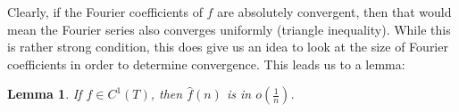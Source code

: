 \documentclass[12pt, titlepage]{article}
\newtheorem{lem}[thm]{Lemma}
\theoremstyle{definition}
\newcommand{\vep}{\varepsilon}
\newcommand{\norm}[1]{\left\lVert#1\right\rVert}
\begin{document}
Clearly, if the Fourier coefficients of $f$ are absolutely convergent, then that would mean the Fourier series also converges uniformly (triangle inequality). While this is rather strong condition, this does give us an idea to look at the size of Fourier coefficients in order to determine convergence. This leads us to a lemma:
%
%    
%
%
\begin{lem}
    If $f \in C^1(T)$, then $\widehat{f}(n)$ is in $o\left( \frac{1}{n} \right)$.
\end{lem}
\end{document}
